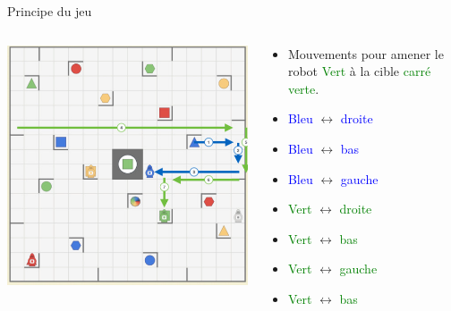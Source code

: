 \documentclass{beamer}
\begin{document}
\begin{frame}{Principe du jeu}
    \begin{columns}
        \begin{column}{0.6\textwidth}
        \vspace{\topsep}
        \includegraphics[scale=0.4]{Images/r9.png}%
        \end{column}
        
        \begin{column}{0.4\textwidth}
        \begin{itemize}
        \item Mouvements pour amener le robot \textcolor{green}{Vert} à la cible \textcolor{green}{carré verte}.
        \item \textcolor{blue}{Bleu} $\longleftrightarrow$ \textcolor{blue}{droite}
        \item \textcolor{blue}{Bleu} $\longleftrightarrow$ \textcolor{blue}{bas}
        \item \textcolor{blue}{Bleu} $\longleftrightarrow$ \textcolor{blue}{gauche}
        \item \textcolor{green}{Vert} $\longleftrightarrow$ \textcolor{green}{droite}
        \item \textcolor{green}{Vert} $\longleftrightarrow$ \textcolor{green}{bas}
        \item \textcolor{green}{Vert} $\longleftrightarrow$ \textcolor{green}{gauche}
        \item \textcolor{green}{Vert} $\longleftrightarrow$ \textcolor{green}{bas}
        \end{itemize}
        \end{column}
    \end{columns}
\end{frame}
\end{document}
